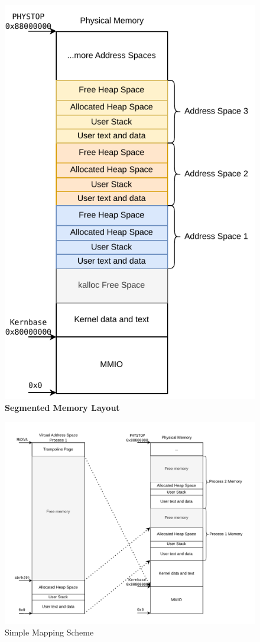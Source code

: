 \begin{figure}[ht!]
    \centering
    \includegraphics[]{figures/segmented_layout.pdf}
    \caption[Segmented Memory Layout]{\textbf{Segmented Memory Layout}}
    \label{fig:theory:segLayout}
\end{figure}

\begin{figure}[ht!]
    \centering
    \includegraphics[]{figures/simple_mapping.pdf}

    \caption[Simple Mapping Scheme]{Simple Mapping Scheme}
    \label{fig:theory:simplemapping}
\end{figure}